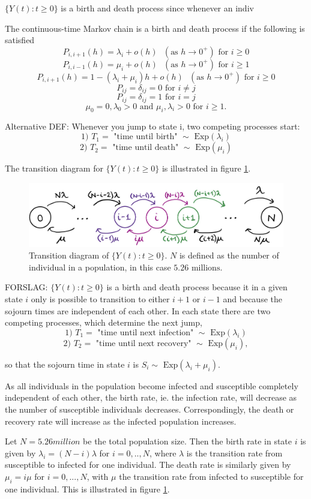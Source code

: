 $\{Y(t):t \geq 0\}$ is a birth and death process since whenever an indiv


The continuous-time Markov chain is a birth and death process if the following is satisfied
$$P_{i, i+1}(h) = \lambda_i + o(h) \text{ }(\text{as } h\rightarrow 0^+) \text{ for } i \geq 0$$
$$P_{i, i-1}(h) = \mu_i + o(h) \text{ }(\text{as } h\rightarrow 0^+) \text{ for } i \geq 1$$
$$P_{i, i+1}(h) = 1 - (\lambda_i + \mu_i)h+ o(h) \text{ }(\text{as } h\rightarrow 0^+) \text{ for } i \geq 0$$
$$ P_{ij} = \delta_{ij} = 0 \text{ for } i \neq j $$
$$ P_{ij} = \delta_{ij} = 1 \text{ for } i = j $$
$$\mu_0 = 0, \lambda_0 > 0\text{ and } \mu_i, \lambda_i > 0 \text{ for } i\geq1.$$

Alternative DEF:
Whenever you jump to state i, two competing processes start: 
$$\text{1) } T_1  = \text{ "time until birth" } \sim \text{ Exp}(\lambda_i)$$
$$\text{2) } T_2 = \text{ "time until death" } \sim \text{ Exp}(\mu_i)$$

The transition diagram for $\{Y(t): t\geq 0\}$ is illustrated in figure \ref{transdiagramY}.

\begin{figure}
    \centering
    \includegraphics[width=140mm]{TransDiag1F.png}
    \caption{Transition diagram of $\{Y(t):t \geq 0 \}$. $N$ is defined as the number of individual in a population, in this case $5.26 \text{ millions.}$}
    \label{transdiagramY}
\end{figure}


FORSLAG: $\{Y(t):t \geq 0\}$ is a birth and death process because it in a given state $i$ only is possible to transition to either $i+1$ or $i-1$ and because the sojourn times are independent of each other. In each state there are two competing processes, which determine the next jump,
$$\text{1) } T_1  = \text{ "time until next infection" } \sim \text{ Exp}(\lambda_i)$$
$$\text{2) } T_2 = \text{ "time until next recovery" } \sim \text{ Exp}(\mu_i),$$

so that the sojourn time in state $i$ is $S_i \sim \text{ Exp}(\lambda_i +\mu_i)$.

As all individuals in the population become infected and susceptible completely independent of each other, the birth rate, ie. the infection rate, will decrease as the number of susceptible individuals decreases. Correspondingly, the death or recovery rate will increase as the infected population increases. 

Let $N=5.26 million$ be the total population size. Then the birth rate in state $i$ is given by $\lambda_i=(N-i)\lambda$ for $i=0,..,N$, where $\lambda$ is the transition rate from susceptible to infected for one individual. The death rate is similarly given by $\mu_i = i\mu$ for $i=0,...,N$, with $\mu$ the transition rate from infected to susceptible for one individual. This is illustrated in figure \ref{transdiagramY}.

